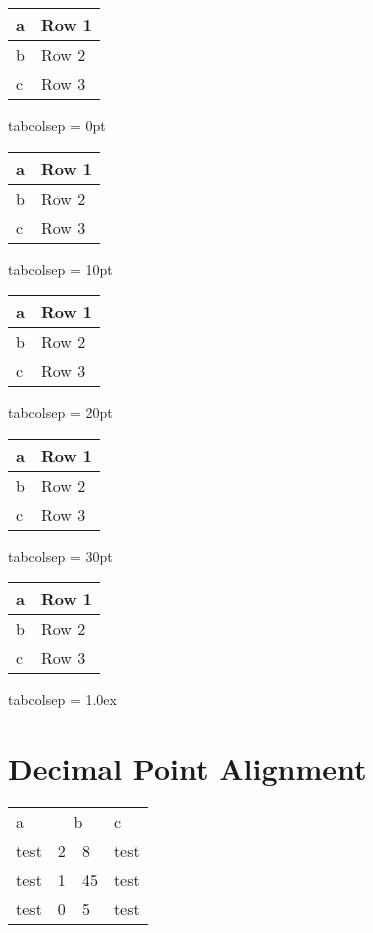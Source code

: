 \documentclass[12pt,a4paper]{report}
\begin{document}
			\setlength{\tabcolsep}{0pt}
			\begin{tabular}{|l|l|}
			\hline
			a & Row 1 \\ \hline
			b & Row 2 \\ \hline
			c & Row 3 \\ \hline
			\end{tabular}			tabcolsep = 0pt
	
			\setlength{\tabcolsep}{10pt}
			\begin{tabular}{|l|l|}
			\hline
			a & Row 1 \\ \hline
			b & Row 2 \\ \hline
			c & Row 3 \\ \hline
			\end{tabular}			tabcolsep = 10pt
			
			\setlength{\tabcolsep}{20pt}
			\begin{tabular}{|l|l|}
			\hline
			a & Row 1 \\ \hline
			b & Row 2 \\ \hline
			c & Row 3 \\ \hline
			\end{tabular}			tabcolsep = 20pt
			
			\setlength{\tabcolsep}{30pt}
			\begin{tabular}{|l|l|}
			\hline
			a & Row 1 \\ \hline
			b & Row 2 \\ \hline
			c & Row 3 \\ \hline
			\end{tabular}			tabcolsep = 30pt
			
			\setlength{\tabcolsep}{1.0ex}
			\begin{tabular}{|l|l|}
			\hline
			a & Row 1 \\ \hline
			b & Row 2 \\ \hline
			c & Row 3 \\ \hline
			\end{tabular}			tabcolsep = 1.0ex
			\setlength{\tabcolsep}{6pt}
	
	
	
	
\newpage  
\section{Decimal Point Alignment}
\null


\begin{tabular}{|l|r@{.}l|l|}
a & \multicolumn{2}{c|}{b} & c \\
test & 2 & 8 & test \\
test & 1 & 45 & test \\
test & 0 & 5 & test
\end{tabular}
\end{document}
